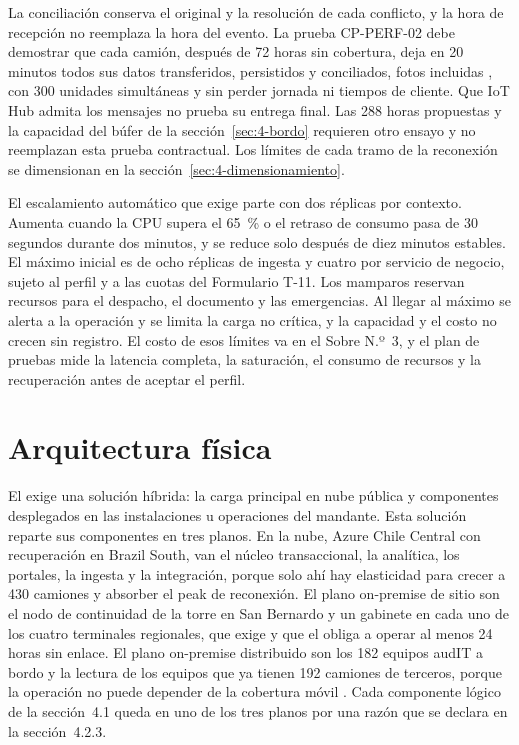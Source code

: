 
La conciliación conserva el original y la resolución de cada conflicto, y la hora de recepción no
reemplaza la hora del evento. La prueba CP-PERF-02 debe demostrar que cada camión, después de 72 horas
sin cobertura, deja en 20 minutos todos sus datos transferidos, persistidos y conciliados, fotos
incluidas , con 300 unidades simultáneas y sin perder jornada ni tiempos de
cliente. Que IoT Hub admita los mensajes no prueba su entrega final. Las
288 horas propuestas y la capacidad del búfer de la sección~\ref{sec:4-bordo} requieren otro ensayo y no
reemplazan esta prueba contractual. Los límites de cada tramo de la reconexión se dimensionan en la
sección~\ref{sec:4-dimensionamiento}.

El escalamiento automático que exige  parte con dos réplicas por contexto. Aumenta
cuando la CPU supera el 65~\% o el retraso de consumo pasa de 30 segundos durante dos minutos, y se
reduce solo después de diez minutos estables. El máximo inicial es de ocho réplicas de ingesta y cuatro
por servicio de negocio, sujeto al perfil y a las cuotas del Formulario T-11. Los mamparos reservan
recursos para el despacho, el documento y las emergencias. Al llegar al máximo se alerta a la operación y
se limita la carga no crítica, y la capacidad y el costo no crecen sin registro. El costo de esos
límites va en el Sobre N.º~3, y el plan de pruebas mide la latencia completa, la saturación, el consumo
de recursos y la recuperación antes de aceptar el perfil.

\section{Arquitectura física}\label{sec:4-fisica}

El  exige una solución híbrida: la carga principal en nube pública y componentes
desplegados en las instalaciones u operaciones del mandante. Esta solución reparte sus componentes en
tres planos. En la nube, Azure Chile Central con recuperación en Brazil South, van el núcleo
transaccional, la analítica, los portales, la ingesta y la integración, porque solo ahí hay elasticidad
para crecer a 430 camiones y absorber el peak de reconexión. El plano on-premise de sitio son el nodo de
continuidad de la torre en San Bernardo y un gabinete en cada uno de los cuatro terminales regionales,
que  exige y que el  obliga a operar al menos 24 horas sin enlace. El
plano on-premise distribuido son los 182 equipos audIT a bordo y la lectura de los equipos que ya
tienen 192 camiones de terceros, porque la operación no puede depender de la cobertura móvil
. Cada componente lógico de la sección~4.1 queda en uno de los tres planos por
una razón que se declara en la sección~4.2.3.

